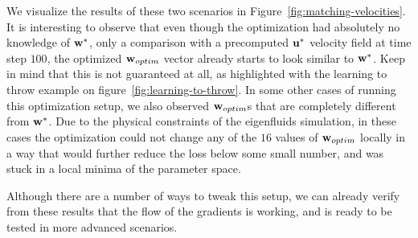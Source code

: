 We visualize the results of these two scenarios in
Figure~\ref{fig:matching-velocities}. It is interesting to observe that even
though the optimization had absolutely no knowledge of $\vb{w}^*$, only
a comparison with a precomputed $\vb{u^*}$ velocity field at time step $100$, the
optimized $\vb{w}_{optim}$ vector already starts to look similar to $\vb{w}^*$.
Keep in mind that this is not guaranteed at all, as highlighted with the
learning to throw example on figure~\ref{fig:learning-to-throw}. In some other
cases of running this optimization setup, we also observed $\vb{w}_{optim}$s
that are completely different from $\vb{w}^*$. Due to the physical constraints
of the eigenfluids simulation, in these cases the optimization could not change
any of the $16$ values of $\vb{w}_{optim}$ locally in a way that would further
reduce the loss below some small number, and was stuck in a local minima of the
parameter space.

Although there are a number of ways to tweak this setup, we can already verify
from these results that  the flow of the gradients is working, and is ready to
be tested in more advanced scenarios.

